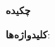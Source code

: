 


\begin{center}
\textbf{چکیده}
\end{center}
\noindent

\bigskip
\noindent \textbf{کلیدواژه‌ها}: 
\newpage
